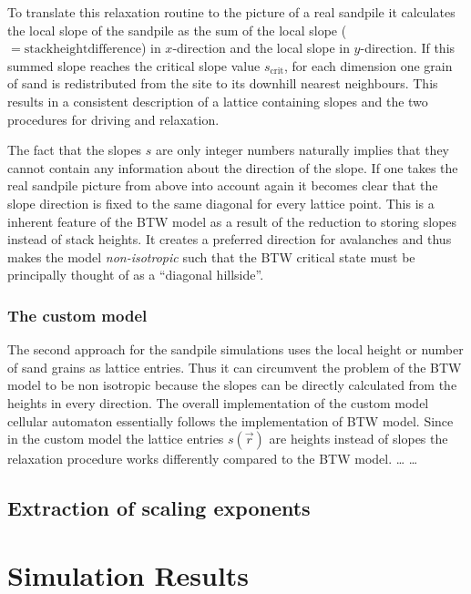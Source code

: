 To translate this relaxation routine to the picture of a real sandpile it calculates the local slope of the sandpile as
the sum of the local slope ($=\mathrm{stack height difference}$) in $x$-direction and the local slope in $y$-direction.
If this summed slope reaches the critical slope value $s_{\mathrm{crit}}$, for each dimension one grain of sand is
redistributed from the site to its downhill nearest neighbours. This results in a consistent description of a lattice
containing slopes and the two procedures for driving and relaxation.

The fact that the slopes $s$ are only integer numbers naturally implies that they cannot contain any information about
the direction of the slope. If one takes the real sandpile picture from above into account again it becomes clear that
the slope direction is fixed to the same diagonal for every lattice point. This is a inherent feature of the BTW model
as a result of the reduction to storing slopes instead of stack heights. It creates a preferred direction for avalanches
and thus makes the model \emph{non-isotropic} such that the BTW critical state must be principally thought of as a
\enquote{diagonal hillside}.

\subsubsection{The custom model}
The second approach for the sandpile simulations uses the local height or number of sand grains as lattice entries.
Thus it can circumvent the problem of the BTW model to be non isotropic because the slopes can be directly calculated
from the heights in every direction.
The overall implementation of the custom model cellular automaton essentially follows the implementation of BTW model.
Since in the custom model the lattice entries $s(\vec{r})$ are heights instead of slopes the relaxation procedure
works differently compared to the BTW model. \dots
\dots%

\subsection{Extraction of scaling exponents}
\label{sec:extractCritExp}

%



\section{Simulation Results}
\label{sec:results}


